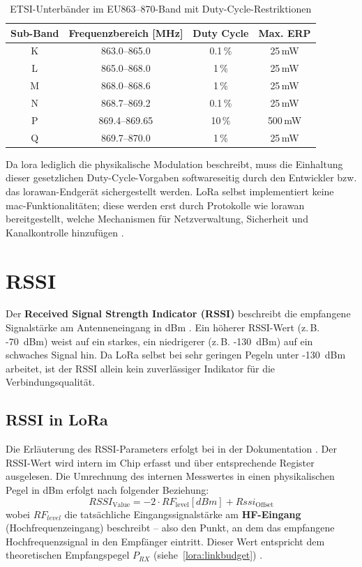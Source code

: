 	\begin{table}[H]
		\centering
		\begin{tabular}{|c|c|c|c|}
			\hline
			\textbf{Sub-Band} & \textbf{Frequenzbereich [MHz]} & \textbf{Duty Cycle} & \textbf{Max. ERP} \\
			\hline
			K & 863.0--865.0   & 0.1\,\%  & 25\,mW \\
			\hline
			L & 865.0--868.0   & 1\,\%    & 25\,mW \\
			\hline
			M & 868.0--868.6   & 1\,\%    & 25\,mW \\
			\hline
			N & 868.7--869.2   & 0.1\,\%  & 25\,mW \\
			\hline
			P & 869.4--869.65  & 10\,\%   & 500\,mW \\
			\hline
			Q & 869.7--870.0   & 1\,\%    & 25\,mW \\
			\hline
		\end{tabular}
		\caption{ETSI-Unterbänder im EU863--870-Band mit Duty-Cycle-Restriktionen 
			\cite{ETSI:2018b}}
	\end{table}


	Da \ac{lora} lediglich die physikalische Modulation beschreibt, muss die Einhaltung dieser gesetzlichen Duty-Cycle-Vorgaben softwareseitig durch den Entwickler bzw. das \ac{lorawan}-Endgerät sichergestellt werden. LoRa selbst implementiert keine \ac{mac}-Funktionalitäten; diese werden erst durch Protokolle wie \ac{lorawan} bereitgestellt, welche Mechanismen für Netzverwaltung, Sicherheit und Kanalkontrolle hinzufügen \cite{Montagny:2022, Semtech:2015}.

	
	
\section{RSSI}

	Der \textbf{Received Signal Strength Indicator (RSSI)} beschreibt die empfangene Signalstärke am Antenneneingang in dBm \cite{Hendricks:2024}. Ein höherer RSSI-Wert (z.\,B. -70~dBm) weist auf ein starkes, ein niedrigerer (z.\,B. -130~dBm) auf ein schwaches Signal hin. 
	Da LoRa selbst bei sehr geringen Pegeln unter -130~dBm arbeitet, ist der RSSI allein kein zuverlässiger Indikator für die Verbindungsqualität.
	
	

\subsection{RSSI in LoRa}
	Die Erläuterung des RSSI-Parameters erfolgt bei \citeauthor{Semtech:2015b} in der Dokumentation .
	Der RSSI-Wert wird intern im Chip erfasst und über entsprechende Register ausgelesen.
	Die Umrechnung des internen Messwertes in einen physikalischen Pegel in dBm erfolgt nach folgender Beziehung:
	\[
	RSSI_{\text{Value}}= -2 \cdot RF_{\text{level}}[dBm] + Rssi_{\text{Offset}}
	\]
	wobei \(RF_{level}\) die tatsächliche Eingangssignalstärke am \textbf{HF-Eingang} (Hochfrequenzeingang) beschreibt – also den Punkt, an dem das empfangene Hochfrequenzsignal in den Empfänger eintritt. 
	Dieser Wert entspricht dem theoretischen Empfangspegel \(P_{RX}\) (siehe~\ref{lora:linkbudget}) . 
	
